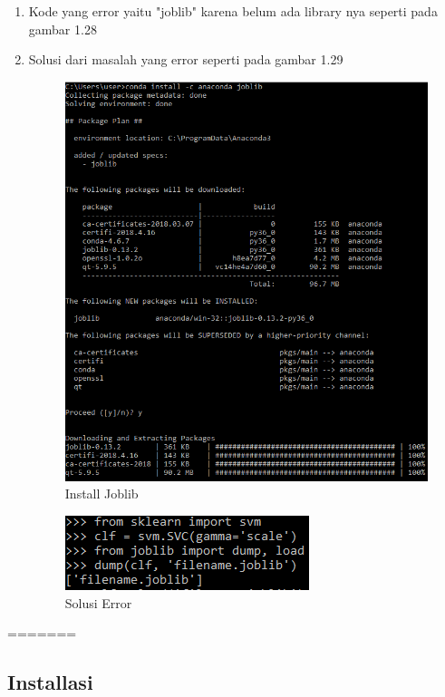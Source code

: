 \begin{enumerate}
\item Kode yang error yaitu "joblib" karena belum ada library nya seperti pada gambar 1.28
\item Solusi dari masalah yang error seperti pada gambar 1.29
\begin{figure}[ht]
\centering
\includegraphics[scale=0.3]{figures/2_17.png}
\caption{Install Joblib}
\end{figure}
\begin{figure}[ht]
\centering
\includegraphics[scale=0.7]{figures/2_18.png}
\caption{Solusi Error}
\end{figure}


\end{enumerate}
=======
\subsection{Installasi}
